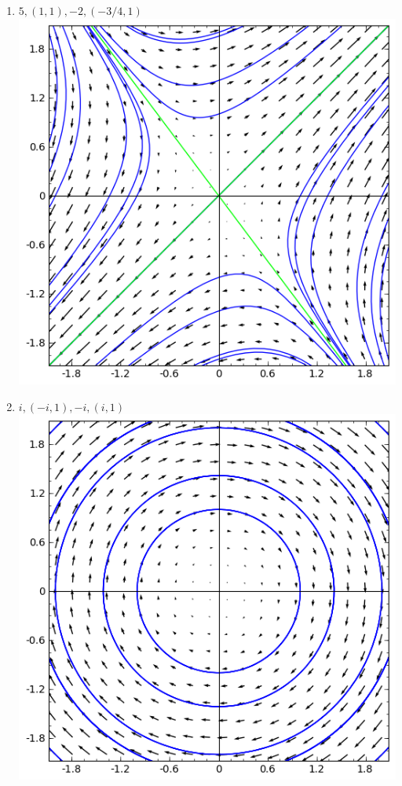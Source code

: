 {\begin{multicols}{2}
\begin{enumerate}
\begin{enumerate}
\item $5, (1,1),  -2, (-3/4,1)$\\\includegraphics[width=\myvfwidth]{02-Applications/support/vfe}
\item $i, (-i,1),  -i, (i,1)$\\\includegraphics[width=\myvfwidth]{02-Applications/support/vff}

\end{enumerate}
\end{enumerate}
\end{multicols}}
